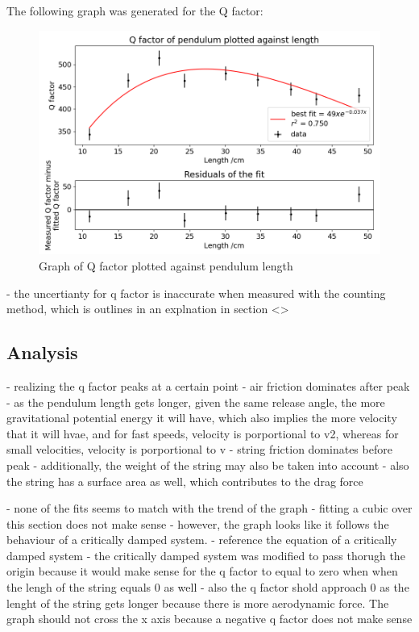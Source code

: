 \documentclass[12pt]{article}
\begin{document}
{{The following graph was generated for the Q factor:
\begin{figure}[!hptb]
    \centering
    \includegraphics[width=\textwidth]{../figures/qfactor_vs_length.png}
    \caption{\centering Graph of Q factor plotted against pendulum length}
    \label{fig:figure 7}
\end{figure}

- the uncertianty for q factor is inaccurate when measured with the counting method, which is outlines in an explnation in section <>


\subsection{Analysis}

- realizing the q factor peaks at a certain point
- air friction dominates after peak
- as the pendulum length gets longer, given the same release angle, the more gravitational potential energy it will have, which also implies the more velocity that it will hvae, and for fast speeds, velocity is porportional to v2, whereas for small velocities, velocity is porportional to v
- string friction dominates before peak
- additionally, the weight of the string may also be taken into account
- also the string has a surface area as well, which contributes to the drag force

- none of the fits seems to match with the trend of the graph
- fitting a cubic over this section does not make sense
- however, the graph looks like it follows the behaviour of a critically damped system.
- reference the equation of a critically damped system
- the critically damped system was modified to pass thorugh the origin because it would make sense for the q factor to equal to zero when when the lengh of the string equals 0 as well
- also the q factor shold approach 0 as the lenght of the string gets longer because there is more aerodynamic force. The graph should not cross the x axis because a negative q factor does not make sense

}}
\end{document}

